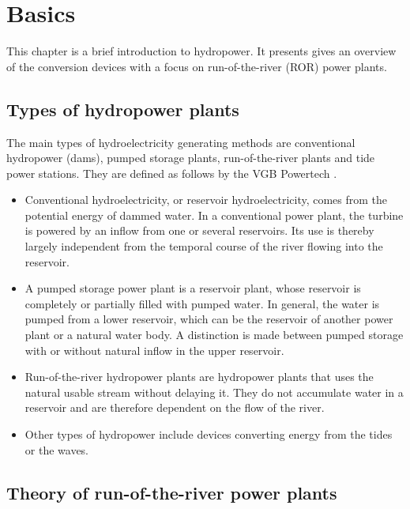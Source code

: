 \chapter{Basics}
\label{chap:basics}

This chapter is a brief introduction to hydropower. It presents gives an overview of the conversion devices with a focus on run-of-the-river (ROR) power plants.

\section{Types of hydropower plants}

The main types of hydroelectricity generating methods are conventional hydropower (dams), pumped storage plants, run-of-the-river plants and tide power stations. They are defined as follows by the VGB Powertech \cite{vgb}.

\begin{itemize}
 \item Conventional hydroelectricity, or reservoir hydroelectricity, comes from the potential energy of dammed water. In a conventional power plant, the turbine is powered by an inflow from one or several reservoirs. Its use is thereby largely independent from the temporal course of the river flowing into the reservoir.
 \item A pumped storage power plant is a reservoir plant, whose reservoir is completely or partially filled with pumped water. In general, the water is pumped from a lower reservoir, which can be the reservoir of another power plant or a natural water body. A distinction is made between pumped storage with or without natural inflow in the upper reservoir.
 \item Run-of-the-river hydropower plants are hydropower plants that uses the natural usable stream without delaying it. They do not accumulate water in a reservoir and are therefore dependent on the flow of the river.
 \item Other types of hydropower include devices converting energy from the tides or the waves.
\end{itemize}


\section{Theory of run-of-the-river power plants}
